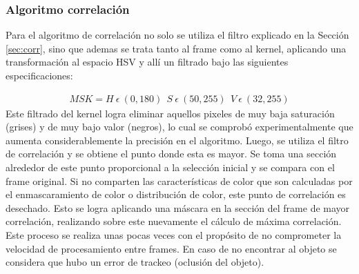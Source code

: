 \subsubsection{Algoritmo correlación}
Para el algoritmo de correlación no solo se utiliza el filtro explicado en la Sección \ref{sec:corr}, sino que ademas se trata tanto al frame como al kernel, aplicando una transformación al espacio HSV y allí un filtrado bajo las siguientes especificaciones: 
            
\begin{align}
MSK = H \  \epsilon \ (0,180 ) \ \ S \  \epsilon \ (50,255) \ \ V \ \epsilon \ (32,255)
\end{align}
Este filtrado del kernel logra eliminar aquellos pixeles de muy baja saturación (grises) y de muy bajo valor (negros), lo cual se comprobó experimentalmente que aumenta considerablemente la precisión en el algoritmo.
Luego, se utiliza el filtro de correlación y se obtiene el punto donde esta es mayor. Se toma una sección alrededor de este punto proporcional a la selección inicial y se compara con el frame original. Si no comparten las características de color que son calculadas por el enmascaramiento de color o distribución de color, este punto de correlación es desechado. Esto se logra aplicando una máscara en la sección del frame de mayor correlación, realizando sobre este nuevamente el cálculo de máxima correlación. Este proceso se realiza unas pocas veces con el propósito de no comprometer la velocidad de procesamiento entre frames. En caso de no encontrar al objeto se considera que hubo un error de trackeo (oclusión del objeto).\\


